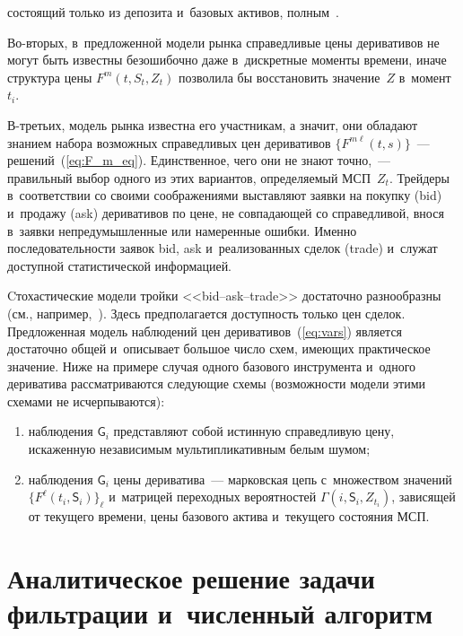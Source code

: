 \begin{multicols}{2}
\pagebreak

\noindent
 со\-сто\-ящий только из депозита и~базовых активов, пол\-ным~\cite{Sh_98, KS_16}.

Во-вторых, в~предложенной модели рынка справедливые цены деривативов не могут 
быть известны безошибочно даже в~дискретные моменты времени, иначе структура 
цены $F^m(t,S_t,Z_t)$ позволила бы восстановить значение~$Z$ в~момент~$t_i$.

В-третьих, модель рынка известна его участникам, а значит, они обладают знанием 
набора возможных справедливых цен деривативов $\{F^{m\ell}(t,s)\}$~--- решений~(\ref{eq:F_m_eq}). 
Единственное, чего они не знают точно,~---  правильный выбор 
одного из этих вариантов, определяемый МСП~$Z_t$. Трейдеры в~соответствии со 
своими соображениями выставляют заявки на покупку ({bid}) и~продажу ({ask}) 
деривативов по цене, не совпадающей со справедливой, внося в~заявки 
непредумышленные или намеренные ошибки. Именно последовательности заявок bid, 
ask и~реализованных сделок ({trade}) и~служат доступной статистической 
информацией.

Cтохастические модели тройки <<bid--ask--trade>> достаточно разнообразны 
(см., например,~\cite{BSW_04, CKS_12, CM_21, LVSS_13, KR_17}). Здесь 
предполагается доступность только цен сделок. Предложенная модель наблюдений цен 
деривативов~(\ref{eq:vars}) является достаточно общей и~описывает большое число 
схем, имеющих практическое значение. Ниже на примере случая одного 
базового инструмента и~одного дериватива  рас\-смат\-ри\-ва\-ют\-ся сле\-ду\-ющие схемы 
(возможности модели этими схемами не исчерпываются):
\begin{enumerate}[(1)]
\item
наблюдения $\mathsf{G}_i$ представляют собой истинную справедливую цену, 
искаженную независимым мультипликативным белым шумом;\\[-13pt]
\item
наблюдения $\mathsf{G}_i$ цены дериватива~--- марковская цепь с~множеством 
значений $\{F^{\ell}(t_i, \mathsf{S}_i)\}_{\ell}$ и~мат\-ри\-цей переходных 
вероятностей $\Gamma(i, \mathsf{S}_i,Z_{t_i})$, зависящей от текущего времени, 
цены базового актива и~текущего со\-сто\-яния МСП.
\end{enumerate}

\vspace*{-7pt}


\section{Аналитическое решение задачи фильтрации и~численный алгоритм}


\end{multicols}
